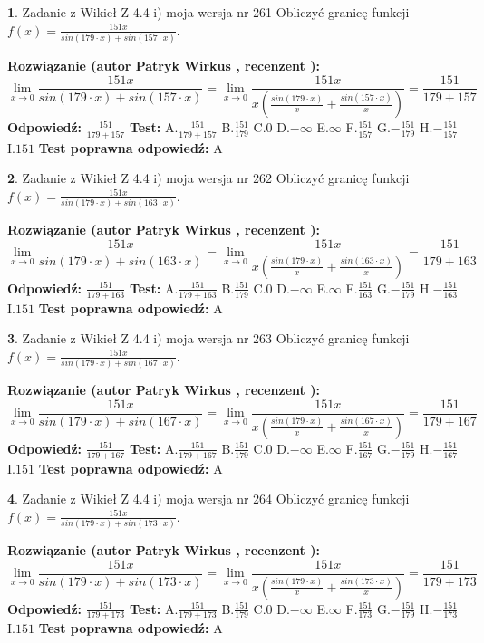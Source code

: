 \documentclass[12pt, a4paper]{article}
\theoremstyle{definition} %
\newtheorem{zad}{}
\newcommand{\zadStart}[1]{\begin{zad}#1\newline}
\newcommand{\zadStop}{\end{zad}}
\newcommand{\rozwStart}[2]{\noindent \textbf{Rozwiązanie (autor #1 , recenzent #2): }\newline}
\newcommand{\rozwStop}{\newline}
\newcommand{\odpStart}{\noindent \textbf{Odpowiedź:}\newline}
\newcommand{\odpStop}{\newline}
\newcommand{\testStart}{\noindent \textbf{Test:}\newline}
\newcommand{\testStop}{\newline}
\newcommand{\kluczStart}{\noindent \textbf{Test poprawna odpowiedź:}\newline}
\newcommand{\kluczStop}{\newline}
\begin{document}
\zadStart{Zadanie z Wikieł Z 4.4 i) moja wersja nr 261}
Obliczyć granicę funkcji $f(x)=\frac{151x}{sin(179\cdot x) +sin(157\cdot x)}$.
\zadStop
\rozwStart{Patryk Wirkus}{}
$$\lim\limits_{x\to 0}\frac{151x}{sin(179\cdot x) +sin(157\cdot x)}=\lim\limits_{x\to 0}\frac{151x}{x(\frac{sin(179\cdot x)}{x}+\frac{sin(157\cdot x)}{x})}=\frac{151}{179+157}$$
\rozwStop
\odpStart
$\frac{151}{179+157}$
\odpStop
\testStart
A.$\frac{151}{179+157}$
B.$\frac{151}{179}$
C.$0$
D.$-\infty$
E.$\infty$
F.$\frac{151}{157}$
G.$-\frac{151}{179}$
H.$-\frac{151}{157}$
I.$151$
\testStop
\kluczStart
A
\kluczStop



\zadStart{Zadanie z Wikieł Z 4.4 i) moja wersja nr 262}
Obliczyć granicę funkcji $f(x)=\frac{151x}{sin(179\cdot x) +sin(163\cdot x)}$.
\zadStop
\rozwStart{Patryk Wirkus}{}
$$\lim\limits_{x\to 0}\frac{151x}{sin(179\cdot x) +sin(163\cdot x)}=\lim\limits_{x\to 0}\frac{151x}{x(\frac{sin(179\cdot x)}{x}+\frac{sin(163\cdot x)}{x})}=\frac{151}{179+163}$$
\rozwStop
\odpStart
$\frac{151}{179+163}$
\odpStop
\testStart
A.$\frac{151}{179+163}$
B.$\frac{151}{179}$
C.$0$
D.$-\infty$
E.$\infty$
F.$\frac{151}{163}$
G.$-\frac{151}{179}$
H.$-\frac{151}{163}$
I.$151$
\testStop
\kluczStart
A
\kluczStop



\zadStart{Zadanie z Wikieł Z 4.4 i) moja wersja nr 263}
Obliczyć granicę funkcji $f(x)=\frac{151x}{sin(179\cdot x) +sin(167\cdot x)}$.
\zadStop
\rozwStart{Patryk Wirkus}{}
$$\lim\limits_{x\to 0}\frac{151x}{sin(179\cdot x) +sin(167\cdot x)}=\lim\limits_{x\to 0}\frac{151x}{x(\frac{sin(179\cdot x)}{x}+\frac{sin(167\cdot x)}{x})}=\frac{151}{179+167}$$
\rozwStop
\odpStart
$\frac{151}{179+167}$
\odpStop
\testStart
A.$\frac{151}{179+167}$
B.$\frac{151}{179}$
C.$0$
D.$-\infty$
E.$\infty$
F.$\frac{151}{167}$
G.$-\frac{151}{179}$
H.$-\frac{151}{167}$
I.$151$
\testStop
\kluczStart
A
\kluczStop



\zadStart{Zadanie z Wikieł Z 4.4 i) moja wersja nr 264}
Obliczyć granicę funkcji $f(x)=\frac{151x}{sin(179\cdot x) +sin(173\cdot x)}$.
\zadStop
\rozwStart{Patryk Wirkus}{}
$$\lim\limits_{x\to 0}\frac{151x}{sin(179\cdot x) +sin(173\cdot x)}=\lim\limits_{x\to 0}\frac{151x}{x(\frac{sin(179\cdot x)}{x}+\frac{sin(173\cdot x)}{x})}=\frac{151}{179+173}$$
\rozwStop
\odpStart
$\frac{151}{179+173}$
\odpStop
\testStart
A.$\frac{151}{179+173}$
B.$\frac{151}{179}$
C.$0$
D.$-\infty$
E.$\infty$
F.$\frac{151}{173}$
G.$-\frac{151}{179}$
H.$-\frac{151}{173}$
I.$151$
\testStop
\kluczStart
A
\kluczStop
\end{document}
